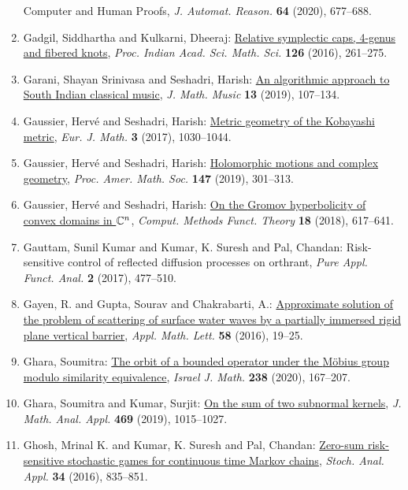 \begin{enumerate}
{{C}omputer and {H}uman {P}roofs}, \emph{J. Automat. Reason.} {\bf 64} (2020), 677--688.
\item Gadgil, Siddhartha and Kulkarni, Dheeraj: \href{https://doi.org/10.1007/s12044-016-0278-3}{Relative symplectic caps, 4-genus and fibered knots}, \emph{Proc. Indian Acad. Sci. Math. Sci.} {\bf 126} (2016), 261--275.
\item Garani, Shayan Srinivasa and Seshadri, Harish: \href{https://doi.org/10.1080/17459737.2019.1604845}{An algorithmic approach to {S}outh {I}ndian classical music}, \emph{J. Math. Music} {\bf 13} (2019), 107--134.
\item Gaussier, Herv\'{e} and Seshadri, Harish: \href{https://doi.org/10.1007/s40879-017-0177-x}{Metric geometry of the {K}obayashi metric}, \emph{Eur. J. Math.} {\bf 3} (2017), 1030--1044.
\item Gaussier, Herv\'{e} and Seshadri, Harish: \href{https://doi.org/10.1090/proc/14217}{Holomorphic motions and complex geometry}, \emph{Proc. Amer. Math. Soc.} {\bf 147} (2019), 301--313.
\item Gaussier, Herv\'{e} and Seshadri, Harish: \href{https://doi.org/10.1007/s40315-018-0243-5}{On the {G}romov hyperbolicity of convex domains in {$\Bbb
C^n$}}, \emph{Comput. Methods Funct. Theory} {\bf 18} (2018), 617--641.
\item Gauttam, Sunil Kumar and Kumar, K. Suresh and Pal, Chandan: Risk-sensitive control of reflected diffusion processes on
orthrant, \emph{Pure Appl. Funct. Anal.} {\bf 2} (2017), 477--510.
\item Gayen, R. and Gupta, Sourav and Chakrabarti, A.: \href{https://doi.org/10.1016/j.aml.2016.01.018}{Approximate solution of the problem of scattering of surface
water waves by a partially immersed rigid plane vertical
barrier}, \emph{Appl. Math. Lett.} {\bf 58} (2016), 19--25.
\item Ghara, Soumitra: \href{https://doi.org/10.1007/s11856-020-2016-x}{The orbit of a bounded operator under the {M}\"{o}bius group
modulo similarity equivalence}, \emph{Israel J. Math.} {\bf 238} (2020), 167--207.
\item Ghara, Soumitra and Kumar, Surjit: \href{https://doi.org/10.1016/j.jmaa.2018.09.048}{On the sum of two subnormal kernels}, \emph{J. Math. Anal. Appl.} {\bf 469} (2019), 1015--1027.
\item Ghosh, Mrinal K. and Kumar, K. Suresh and Pal, Chandan: \href{https://doi.org/10.1080/07362994.2016.1180995}{Zero-sum risk-sensitive stochastic games for continuous time
{M}arkov chains}, \emph{Stoch. Anal. Appl.} {\bf 34} (2016), 835--851.

\end{enumerate}
